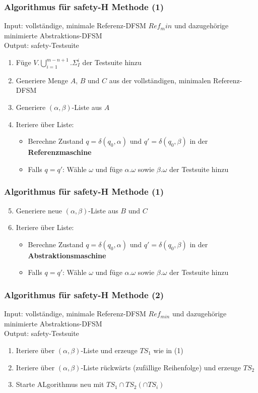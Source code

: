     \begin{frame}
    \frametitle{Algorithmus für safety-H Methode (1)}
    Input: vollständige, minimale Referenz-DFSM $Ref_min$ und dazugehörige minimierte Abstraktions-DFSM\\
    Output: safety-Testsuite
    \begin{enumerate}
      \item Füge $V.\bigcup\limits_{i=1}^{m-n+1}.\Sigma_I^i$ der Testsuite hinzu
      \item Generiere Menge $A$, $B$ und $C$ aus der vollständigen, minimalen Referenz-DFSM
      \item Generiere $(\alpha, \beta)$-Liste aus $A$
      \item Iteriere über Liste:
      \begin{itemize}
        \item Berechne Zustand $q = \delta(q_0,\alpha)$ und $q'=\delta(q_0,\beta)$ in der \textbf{Referenzmaschine}
        \item Falls $q = q'$: Wähle $\omega$ und füge $\alpha.\omega$ sowie $\beta.\omega$ der Testsuite hinzu
      \end{itemize}
    \end{enumerate}
    \end{frame}
    
    \begin{frame}
    \frametitle{Algorithmus für safety-H Methode (1)}
    \begin{enumerate}
      \setcounter{enumi}{4}
      \item Generiere neue $(\alpha, \beta)$-Liste aus $B$ und $C$
      \item Iteriere über Liste:
      \begin{itemize}
        \item Berechne Zustand $q = \delta(q_0,\alpha)$ und $q'=\delta(q_0,\beta)$ in der \textbf{Abstraktionsmaschine}
        \item Falls $q = q'$: Wähle $\omega$ und füge $\alpha.\omega$ sowie $\beta.\omega$ der Testsuite hinzu
      \end{itemize}
    \end{enumerate}
    \end{frame}
    
    \begin{frame}
    \frametitle{Algorithmus für safety-H Methode (2)}
    Input: vollständige, minimale Referenz-DFSM $Ref_{min}$ und dazugehörige minimierte Abstraktions-DFSM\\
    Output: safety-Testsuite
    \begin{enumerate}
      \item Iteriere über $(\alpha,\beta)$-Liste und erzeuge $TS_1$ wie in (1)
      \item Iteriere über $(\alpha,\beta)$-Liste rückwärts (zufällige Reihenfolge) und erzeuge $TS_2$
      \item Starte ALgorithmus neu mit $TS_1 \cap TS_2 (\cap TS_i)$
    \end{enumerate}
    \end{frame}
    
